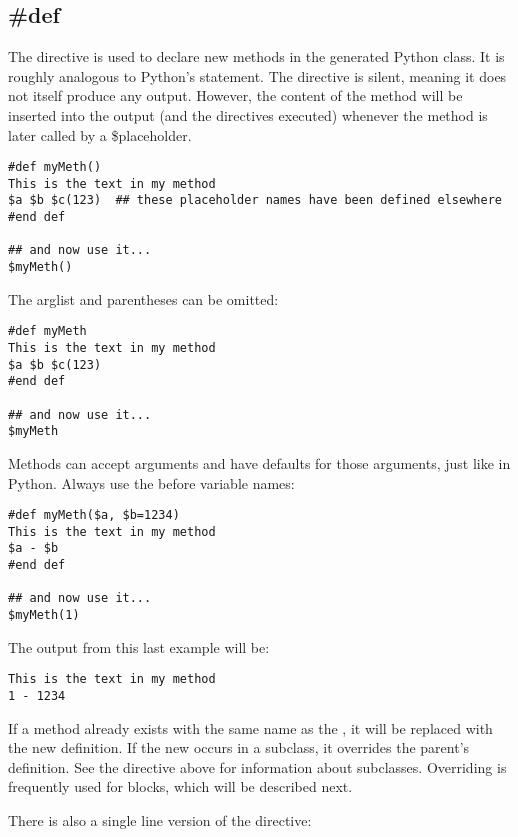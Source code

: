 
\subsection{\#def}
\label{inheritanceEtc.def}

The  directive is used to declare new methods in the generated
Python class.  It is roughly analogous to Python's  statement.  
The directive is silent, meaning it does not itself produce any output.
However, the content of the method will be inserted into the output (and the
directives executed) whenever the method is later called by a \$placeholder.

\begin{verbatim}
#def myMeth()
This is the text in my method 
$a $b $c(123)  ## these placeholder names have been defined elsewhere
#end def

## and now use it...
$myMeth()
\end{verbatim}

The arglist and parentheses can be omitted:
\begin{verbatim}
#def myMeth
This is the text in my method 
$a $b $c(123)
#end def

## and now use it...
$myMeth
\end{verbatim}

Methods can accept arguments and have defaults for those arguments, just like
in Python.  Always use the \code{\$} before variable names:
\begin{verbatim}
#def myMeth($a, $b=1234)
This is the text in my method 
$a - $b
#end def

## and now use it...
$myMeth(1)
\end{verbatim}

The output from this last example will be:

\begin{verbatim}
This is the text in my method 
1 - 1234
\end{verbatim}

If a method already exists with the same name as the , it will be
replaced with the new definition.  If the new  occurs in a
subclass, it overrides the parent's definition.  See the 
directive above for information about subclasses.  Overriding is frequently
used for blocks, which will be described next.

There is also a single line version of the  directive:

